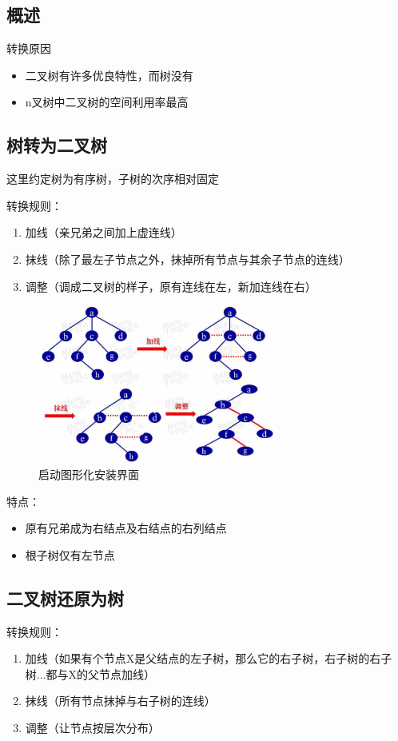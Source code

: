 \documentclass[AutoFakeBold]{LZUThesis2007}
\begin{document}
		\subsection{概述}
		转换原因
		\begin{itemize}
			\item 二叉树有许多优良特性，而树没有
			\item n叉树中二叉树的空间利用率最高
		\end{itemize}
		\subsection{树转为二叉树}
		这里约定树为有序树，子树的次序相对固定

		转换规则：
		\begin{enumerate}
			\item 加线（亲兄弟之间加上虚连线）
			\item 抹线（除了最左子节点之外，抹掉所有节点与其余子节点的连线）
			\item 调整（调成二叉树的样子，原有连线在左，新加连线在右）
		\end{enumerate}
		\begin{figure}[H]
		    \centering
		    \includegraphics[width=0.7\textwidth]{figures/7.3.png}
		    \caption{启动图形化安装界面}
		    \label{fig_install_texlive}
		\end{figure}
		特点：
		\begin{itemize}
			\item 原有兄弟成为右结点及右结点的右列结点
			\item 根子树仅有左节点
		\end{itemize}

		\subsection{二叉树还原为树}
		转换规则：
		\begin{enumerate}
			\item 加线（如果有个节点X是父结点的左子树，那么它的右子树，右子树的右子树...都与X的父节点加线）
			\item 抹线（所有节点抹掉与右子树的连线）
			\item 调整（让节点按层次分布）
		\end{enumerate}
\end{document}
